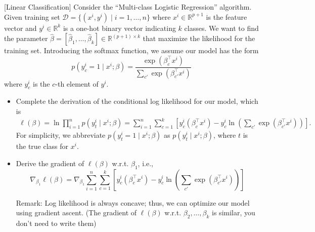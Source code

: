 \item {} [Linear Classification] Consider the ``Multi-class Logistic Regression'' algorithm. Given training set $\mathcal{D}=\{(x^i,y^i)\mid i=1,\ldots,n\}$ where $x^i\in \mathbb{R}^{p+1}$ is the feature vector and $y^i\in \mathbb{R}^{k}$ is a one-hot binary vector indicating $k$ classes. We want to find the parameter $\hat{\beta}=[\hat{\beta}_1,\ldots,\hat{\beta}_k]\in \mathbb{R}^{(p+1)\times k}$ that maximize the likelihood for the training set. Introducing the softmax function, we assume our model has the form
$$p(y_c^i=1\mid x^i;\beta) = \frac{\exp(\beta_c^\top x^i)}{\sum_{c'}\exp(\beta_{c'}^\top x^i)}$$
where $y_c^i$ is the $c$-th element of $y^i$.

\begin{itemize}
\item[(a)] Complete the derivation of the conditional log likelihood for our model, which is
\begin{align*}
    \ell(\beta) = \ln \prod_{i=1}^{n} p(y_t^i\mid x^i;\beta)
    =\sum_{i=1}^{n}\sum_{c=1}^{k}\left[ y_c^i(\beta_c^\top x^i) - y_c^i\ln \left(\sum_{c'}\exp(\beta_{c'}^\top x^i) \right)\right].
\end{align*}
For simplicity, we abbreviate $p(y_t^i=1\mid x^i;\beta)$ as $p(y_t^i\mid x^i;\beta)$, where $t$ is the true class for $x^i$.~
\item[(b)] Derive the gradient of $\ell(\beta)$ w.r.t. $\beta_1$, i.e.,
$$\nabla_{\beta_1}\ell(\beta) = \nabla_{\beta_1} \sum_{i=1}^{n}\sum_{c=1}^{k}\left[ y_c^i(\beta_c^\top x^i) - y_c^i\ln \left(\sum_{c'}\exp(\beta_{c'}^\top x^i) \right)\right]$$

Remark: Log likelihood is always concave; thus, we can optimize our model using gradient ascent. (The gradient of $\ell(\beta)$ w.r.t. $\beta_2,\ldots,\beta_k$ is similar, you don't need to write them)~
\end{itemize}

\solution

